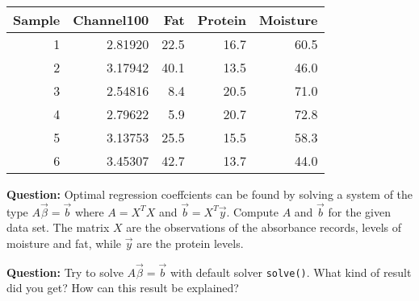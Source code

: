 \documentclass[]{article}
\newenvironment{Shaded}{\begin{snugshade}}{\end{snugshade}}
\newcommand{\KeywordTok}[1]{\textcolor[rgb]{0.13,0.29,0.53}{\textbf{#1}}}
\newcommand{\DataTypeTok}[1]{\textcolor[rgb]{0.13,0.29,0.53}{#1}}
\newcommand{\DecValTok}[1]{\textcolor[rgb]{0.00,0.00,0.81}{#1}}
\newcommand{\StringTok}[1]{\textcolor[rgb]{0.31,0.60,0.02}{#1}}
\newcommand{\ControlFlowTok}[1]{\textcolor[rgb]{0.13,0.29,0.53}{\textbf{#1}}}
\newcommand{\OperatorTok}[1]{\textcolor[rgb]{0.81,0.36,0.00}{\textbf{#1}}}
\newcommand{\NormalTok}[1]{#1}
\begin{document}
\begin{longtable}[]{@{}rrrrr@{}}
\toprule
Sample & Channel100 & Fat & Protein & Moisture\tabularnewline
\midrule
\endhead
1 & 2.81920 & 22.5 & 16.7 & 60.5\tabularnewline
2 & 3.17942 & 40.1 & 13.5 & 46.0\tabularnewline
3 & 2.54816 & 8.4 & 20.5 & 71.0\tabularnewline
4 & 2.79622 & 5.9 & 20.7 & 72.8\tabularnewline
5 & 3.13753 & 25.5 & 15.5 & 58.3\tabularnewline
6 & 3.45307 & 42.7 & 13.7 & 44.0\tabularnewline
\bottomrule
\end{longtable}

\textbf{Question:} Optimal regression coeffcients can be found by
solving a system of the type \(A\vec{\beta} = \vec{b}\) where
\(A = X^TX\) and \(\vec{b} = X^T\vec{y}\). Compute \(A\) and \(\vec{b}\)
for the given data set. The matrix \(X\) are the observations of the
absorbance records, levels of moisture and fat, while \(\vec{y}\) are
the protein levels.

\begin{Shaded}
\end{Shaded}

\textbf{Question:} Try to solve \(A\vec{\beta} = \vec{b}\) with default
solver \texttt{solve()}. What kind of result did you get? How can this
result be explained?

\begin{Shaded}
\end{Shaded}
\end{document}
